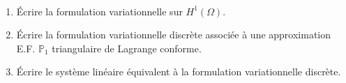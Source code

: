 \documentclass[12pt,a4paper]{article}
\begin{document}
	\begin{exo}$ $
		
		\begin{minipage}{15cm}
			
			\begin{enumerate}
				\item Écrire la formulation variationnelle sur $H^1(\Omega)$.
				
				\item Écrire la formulation variationnelle discrète associée à une approximation  E.F. $\mathbb P_1$ triangulaire de Lagrange conforme.
				
				\item Écrire le système linéaire équivalent à la formulation variationnelle discrète.
			\end{enumerate}
		\end{minipage}
	\end{exo}
\end{document}
